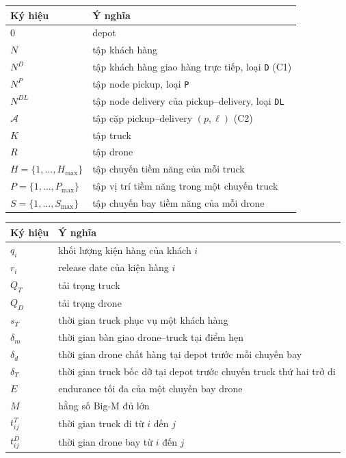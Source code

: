 \documentclass[12pt,a4paper]{article}
\begin{document}
\begin{table}[H]
\centering
\begin{tabular}{ll}
\toprule
Ký hiệu & Ý nghĩa\\
\midrule
$0$ & depot\\
$N$ & tập khách hàng\\
$N^D$ & tập khách hàng giao hàng trực tiếp, loại \texttt{D} (C1)\\
$N^P$ & tập node pickup, loại \texttt{P}\\
$N^{DL}$ & tập node delivery của pickup--delivery, loại \texttt{DL}\\
$\mathcal A$ & tập cặp pickup--delivery $(p,\ell)$ (C2)\\
$K$ & tập truck\\
$R$ & tập drone\\
$H=\{1,\ldots,H_{\max}\}$ & tập chuyến tiềm năng của mỗi truck\\
$P=\{1,\ldots,P_{\max}\}$ & tập vị trí tiềm năng trong một chuyến truck\\
$S=\{1,\ldots,S_{\max}\}$ & tập chuyến bay tiềm năng của mỗi drone\\
\bottomrule
\end{tabular}
\end{table}

\begin{table}[H]
\centering
\begin{tabular}{ll}
\toprule
Ký hiệu & Ý nghĩa\\
\midrule
$q_i$ & khối lượng kiện hàng của khách $i$\\
$r_i$ & release date của kiện hàng $i$\\
$Q_T$ & tải trọng truck\\
$Q_D$ & tải trọng drone\\
$s_T$ & thời gian truck phục vụ một khách hàng\\
$\delta_m$ & thời gian bàn giao drone--truck tại điểm hẹn\\
$\delta_d$ & thời gian drone chất hàng tại depot trước mỗi chuyến bay\\
$\delta_T$ & thời gian truck bốc dỡ tại depot trước chuyến truck thứ hai trở đi\\
$E$ & endurance tối đa của một chuyến bay drone\\
$M$ & hằng số Big-M đủ lớn\\
$t^T_{ij}$ & thời gian truck đi từ $i$ đến $j$\\
$t^D_{ij}$ & thời gian drone bay từ $i$ đến $j$\\
\bottomrule
\end{tabular}
\end{table}
\end{document}
